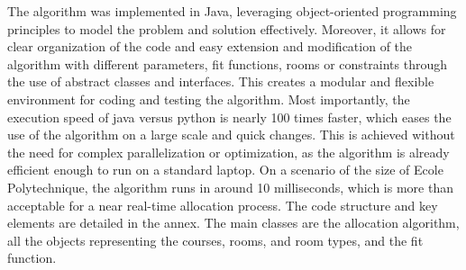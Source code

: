 \documentclass[a4paper, oneside]{article}
\theoremstyle{plain}
\begin{document}
The algorithm was implemented in Java, leveraging object-oriented programming principles to model the problem and solution effectively.
Moreover, it allows for clear organization of the code and easy extension and modification of the algorithm with different parameters, fit functions,
rooms or constraints through the use of abstract classes and interfaces. This creates a modular and flexible environment for coding and testing the algorithm.
Most importantly, the execution speed of java versus python is nearly 100 times faster, which eases the use of the algorithm on a large scale and quick changes.
This is achieved without the need for complex parallelization or optimization, as the algorithm is already efficient enough to run on a standard laptop.
On a scenario of the size of Ecole Polytechnique, the algorithm runs in around 10 milliseconds, which is more than acceptable for a near real-time allocation process.
The code structure and key elements are detailed in the annex. The main classes are the allocation algorithm, all the objects representing the courses, rooms,
and room types, and the fit function.
\end{document}

